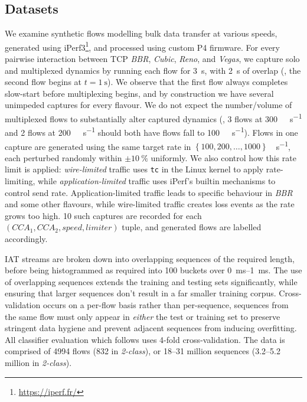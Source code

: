 \subsection{Datasets}
We examine synthetic flows modelling bulk data transfer at various speeds, generated using iPerf3\footnote{\url{https://iperf.fr/}}, and processed using custom P4 firmware.
For every pairwise interaction between TCP \emph{BBR}, \emph{Cubic}, \emph{Reno}, and \emph{Vegas}, we capture solo and multiplexed dynamics by running each flow for \SI{3}{\second}, with \SI{2}{\second} of overlap (\ie, the second flow begins at $t=\SI{1}{\second}$).
We observe that the first flow always completes slow-start before multiplexing begins, and by construction we have several unimpeded captures for every flavour.
We do not expect the number/volume of multiplexed flows to substantially alter captured dynamics (\ie, 3 flows at \SI{300}{\mega\bit\per\second} and 2 flows at \SI{200}{\mega\bit\per\second} should both have flows fall to \SI{100}{\mega\bit\per\second}).
Flows in one capture are generated using the same target rate in $\left\{\num{100},\num{200},\dots,\num{1000}\right\}$\si{\mega\bit\per\second}, each perturbed randomly within $\pm\SI{10}{\percent}$ uniformly.
We also control how this rate limit is applied: \emph{wire-limited} traffic uses \texttt{tc} in the Linux kernel to apply rate-limiting, while \emph{application-limited} traffic uses iPerf's builtin mechanisms to control send rate.
Application-limited traffic leads to specific behaviour in \emph{BBR} and some other flavours, while wire-limited traffic creates loss events as the rate grows too high.
\num{10} such captures are recorded for each $(\mathit{CCA}_1,\mathit{CCA}_2,\mathit{speed},\mathit{limiter})$ tuple, and generated flows are labelled accordingly.

IAT streams are broken down into overlapping sequences of the required length, before being histogrammed as required into \num{100} buckets over \SIrange{0}{1}{\milli\second}.
The use of overlapping sequences extends the training and testing sets significantly, while ensuring that larger sequences don't result in a far smaller training corpus.
Cross-validation occurs on a per-flow basis rather than per-sequence, \ie sequences from the same flow must only appear in \emph{either} the test or training set to preserve stringent data hygiene and prevent adjacent sequences from inducing overfitting.
All classifier evaluation which follows uses 4-fold cross-validation.
The data is comprised of \num{4994} flows (\num{832} in \emph{2-class}), or \numrange{18}{31} million sequences (\numrange{3.2}{5.2} million in \emph{2-class}).

